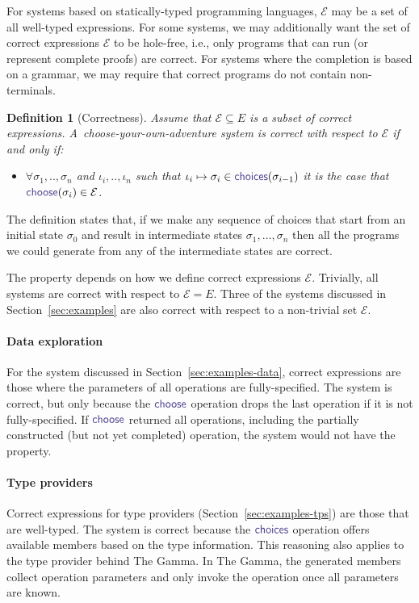 \documentclass[nonacm,anonymous,sigplan,screen]{acmart}
\newcommand{\ident}[1]{\textsf{\color{DarkSlateBlue}{#1}}}
\newcommand{\select}{\textnormal{\ident{choose}}}
\newcommand{\choices}{\textnormal{\ident{choices}}}
\newcommand{\mparagraph}[1]{\vspace{-0.25em}\paragraph{#1}}
\newtheorem{definition}{Definition}
\begin{document}
For systems based on statically-typed programming languages, $\mathcal{E}$ may be
a set of all well-typed expressions. For some systems, we may additionally want the set
of correct expressions $\mathcal{E}$ to be hole-free, i.e., only programs that can run (or
represent complete proofs) are correct. For systems where the completion is based on a grammar,
we may require that correct programs do not contain non-terminals.

\begin{definition}[Correctness]
Assume that $\mathcal{E}\subseteq E$ is a subset of correct expressions.
A~choose-your-own-adventure system is correct with respect to $\mathcal{E}$ if and only if:
\begin{itemize}
\item $\forall \sigma_1,..,\sigma_n$ and $\iota_i,..,\iota_n$ such that
  $\iota_i\mapsto\sigma_i \in \choices(\sigma_{i-1})$ it is the case
that $\select(\sigma_i) \in \mathcal{E}$.
\end{itemize}
\end{definition}

The definition states that, if we make any sequence of choices that start from an initial state
$\sigma_0$ and result in intermediate states $\sigma_1, \ldots, \sigma_n$ then all the programs
we could generate from any of the intermediate states are correct.

The property depends on how we define correct expressions $\mathcal{E}$. Trivially, all systems
are correct with respect to $\mathcal{E}=E$. Three of the systems discussed in
Section~\ref{sec:examples} are also correct with respect to a non-trivial set $\mathcal{E}$.

\mparagraph{Data exploration}
For the system discussed in Section~\ref{sec:examples-data},
correct expressions are those where the parameters of all operations are fully-specified.
The system is correct, but only because the $\select$ operation drops the last
operation if it is not fully-specified. If $\select$ returned all operations, including the
partially constructed (but not yet completed) operation, the system would not have the property.

\mparagraph{Type providers}
Correct expressions for type providers (Section~\ref{sec:examples-tps}) are those that
are well-typed. The system is correct because the $\choices$ operation offers available members
based on the type information. This reasoning also applies to the type provider behind The Gamma.
In The Gamma, the generated members collect operation parameters
and only invoke the operation once all parameters are known.
\end{document}
